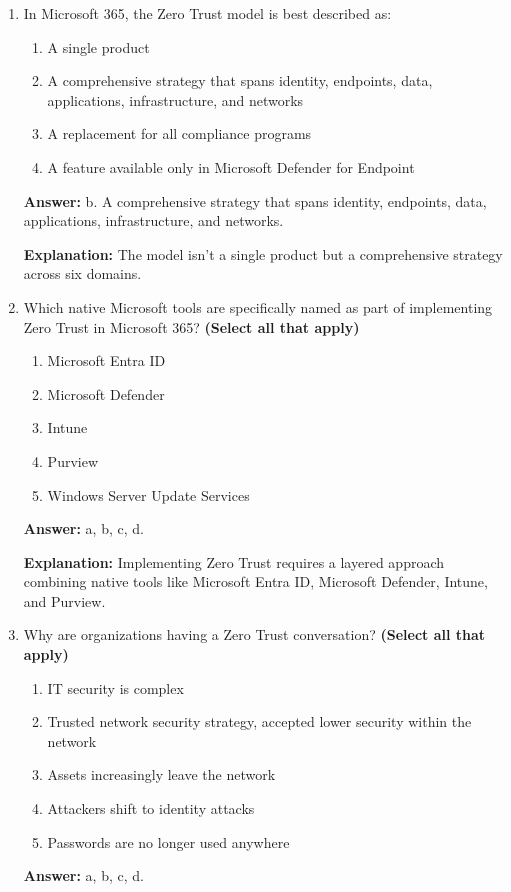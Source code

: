 \documentclass[10pt]{article}
\begin{document}
\begin{enumerate}[leftmargin=*]

\item In Microsoft 365, the Zero Trust model is best described as:
\begin{enumerate}[label=\alph*., leftmargin=1.5em]
\item A single product
\item A comprehensive strategy that spans identity, endpoints, data, applications, infrastructure, and networks
\item A replacement for all compliance programs
\item A feature available only in Microsoft Defender for Endpoint
\end{enumerate}
\textbf{Answer:} b. A comprehensive strategy that spans identity, endpoints, data, applications, infrastructure, and networks.

\textbf{Explanation:} The model isn't a single product but a comprehensive strategy across six domains.

\item Which native Microsoft tools are specifically named as part of implementing Zero Trust in Microsoft 365? \textbf{(Select all that apply)}
\begin{enumerate}[label=\alph*., leftmargin=1.5em]
\item Microsoft Entra ID
\item Microsoft Defender
\item Intune
\item Purview
\item Windows Server Update Services
\end{enumerate}
\textbf{Answer:} a, b, c, d.

\textbf{Explanation:} Implementing Zero Trust requires a layered approach combining native tools like Microsoft Entra ID, Microsoft Defender, Intune, and Purview.

\item Why are organizations having a Zero Trust conversation? \textbf{(Select all that apply)}
\begin{enumerate}[label=\alph*., leftmargin=1.5em]
\item IT security is complex
\item Trusted network security strategy, accepted lower security within the network
\item Assets increasingly leave the network
\item Attackers shift to identity attacks
\item Passwords are no longer used anywhere
\end{enumerate}
\textbf{Answer:} a, b, c, d.


\end{enumerate}
\end{document}
